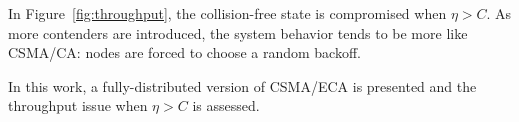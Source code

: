 

In Figure~\ref{fig:throughput}, the collision-free state is compromised when $\eta>C$. As more contenders are introduced, the system behavior tends to be more like CSMA/CA: nodes are forced to choose a random backoff.

In this work, a fully-distributed version of CSMA/ECA is presented and the throughput issue when $\eta > C$ is assessed.